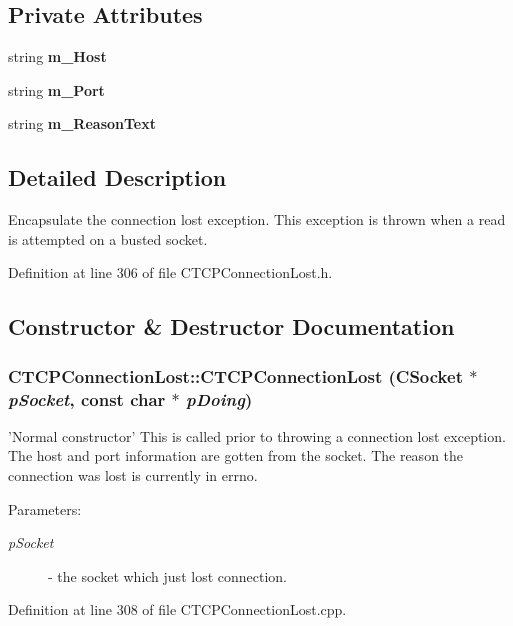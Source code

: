 \subsection*{Private Attributes}
\begin{CompactItemize}
\item 
string {\bf m\_\-Host}
\item 
string {\bf m\_\-Port}
\item 
string {\bf m\_\-Reason\-Text}
\end{CompactItemize}


\subsection{Detailed Description}
Encapsulate the connection lost exception. This exception is thrown when a read is attempted on a busted socket. 



Definition at line 306 of file CTCPConnection\-Lost.h.

\subsection{Constructor \& Destructor Documentation}
\subsubsection{\setlength{\rightskip}{0pt plus 5cm}CTCPConnection\-Lost::CTCPConnection\-Lost ({\bf CSocket} $\ast$ {\em p\-Socket}, const char $\ast$ {\em p\-Doing})}\label{classCTCPConnectionLost_a0}


'Normal constructor' This is called prior to throwing a connection lost exception. The host and port information are gotten from the  socket. The reason the connection was lost is currently in errno.\begin{Desc}
\item[Parameters: ]\par
\begin{description}
\item[{\em 
p\-Socket}]- the socket which just lost connection. \end{description}
\end{Desc}


Definition at line 308 of file CTCPConnection\-Lost.cpp.

